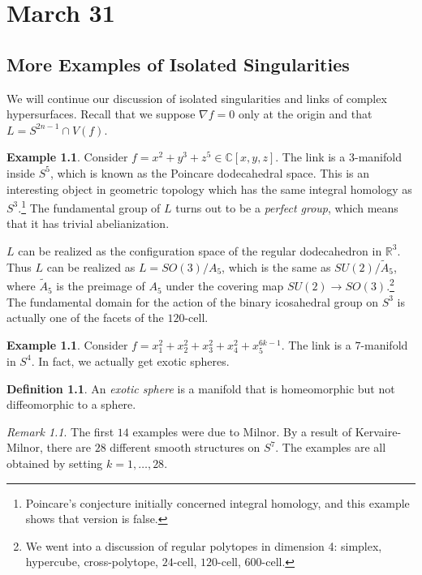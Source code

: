 \documentclass[leqno, openany]{memoir}
\theoremstyle{definition}
\newtheorem{defn}[thm]{Definition}
\newtheorem{exm}[thm]{Example}
\theoremstyle{remark}
\newtheorem{rmk}[thm]{Remark}
\theoremstyle{plain}
\theoremstyle{definition}
\theoremstyle{remark}
\newcommand{\R}{\mathbb{R}}
\newcommand{\C}{\mathbb{C}}
\begin{document}
\chapter{March 31}%

\section{More Examples of Isolated Singularities}%
\label{sec:more_examples_of_isolated_singularities}

We will continue our discussion of isolated singularities and links of complex
hypersurfaces. Recall that we suppose $\nabla f = 0$ only at the origin and
that $L = S^{2n-1} \cap V(f)$.

\begin{exm} Consider $f = x^2 + y^3 + z^5 \in \C[x,y,z]$. The link is a
    $3$-manifold inside $S^5$, which is known as the Poincare dodecahedral
    space. This is an interesting object in geometric topology which has the
    same integral homology as $S^3$.\footnote{Poincare's conjecture initially
    concerned integral homology, and this example shows that version is false.}
    The fundamental group of $L$ turns out to be a \textit{perfect group},
    which means that it has trivial abelianization.

    $L$ can be realized as the configuration space of the regular dodecahedron
in $\R^3$. Thus $L$ can be realized as $L = SO(3)/A_5$, which is the same as
$SU(2) / \widetilde{A}_5$, where $\widetilde{A}_5$ is the preimage of $A_5$
under the covering map $SU(2) \to SO(3)$.\footnote{We went into a discussion of
regular polytopes in dimension 4: simplex, hypercube, cross-polytope,
$24$-cell, $120$-cell, $600$-cell.} The fundamental domain for the action of
the binary icosahedral group on $S^3$ is actually one of the facets of the
$120$-cell.  \end{exm}

\begin{exm} Consider $f = x_1^2 + x_2^2 + x_3^2 + x_4^2 + x_5^{6k-1}$. The link
is a $7$-manifold in $S^4$. In fact, we actually get exotic spheres.  \end{exm}

\begin{defn} An \textit{exotic sphere} is a manifold that is homeomorphic but
not diffeomorphic to a sphere.  \end{defn}

\begin{rmk} The first $14$ examples were due to Milnor. By a result of
Kervaire-Milnor, there are $28$ different smooth structures on $S^7$. The
examples are all obtained by setting $k = 1, \ldots, 28$.  \end{rmk}
\end{document}

